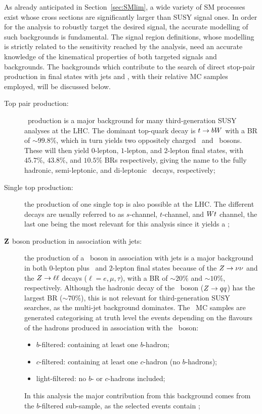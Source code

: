 		As already anticipated in Section~\ref{sec:SMlim}, a wide variety of \ac{SM} processes exist whose cross sections are significantly larger than \ac{SUSY} signal ones. In order for the analysis to robustly target the desired signal, the accurate modelling of such backgrounds is fundamental. The signal region definitions, whose modelling is strictly related to the sensitivity reached by the analysis, need an accurate knowledge of the kinematical properties of both targeted signals and backgrounds. The backgrounds which contribute to the search of direct stop-pair production in final states with jets and \met, with their relative \ac{MC} samples employed, will be discussed below.

		\begin{description}

			\item [Top pair production:] \ttbar\ production is a major background for many third-generation \ac{SUSY} analyses at the LHC. The dominant top-quark decay is $t \rightarrow b W$ with a \ac{BR} of $\sim 99.8\%$, which in turn yields two oppositely charged \bjs\ and \Wboson\ bosons. These will then yield $0$-lepton, $1$-lepton, and $2$-lepton final states, with $45.7\%$, $43.8\%$, and $10.5\%$ \acp{BR} respectively, giving the name to the fully hadronic, semi-leptonic, and di-leptonic \ttbar\ decays, respectively; 
			
			\item [Single top production:] the production of one single top is also possible at the LHC. The different decays are usually referred to as $s$-channel, $t$-channel, and $W t$ channel, the last one being the most relevant for this analysis since it yields a \Wboson; 

			\item [$\mathbf{Z}$ boson production in association with jets:] the production of a \Zboson\ boson in association with jets is a major background in both $0$-lepton plus \met\ and $2$-lepton final states because of the $Z \rightarrow \nu \nu$ and the $Z \rightarrow \ell \ell$ decays ($\ell = e,\mu,\tau$), with a \ac{BR} of $\sim 20\%$ and $\sim 10\%$, respectively. Although the hadronic decay of the \Zboson\ boson ($Z \rightarrow qq$) has the largest \ac{BR} ($\sim 70\%$), this is not relevant for third-generation \ac{SUSY} searches, as the multi-jet background dominates. The \Zjets\ \ac{MC} samples are generated categorising at truth level the events depending on the flavours of the hadrons produced in association with the \Zboson\ boson:
			\begin{itemize}
				\item $b$-filtered: containing at least one $b$-hadron;
				\item $c$-filtered: containing at least one $c$-hadron (no $b$-hadrons);
				\item light-filtered: no $b$- or $c$-hadrons included;
			\end{itemize} 
			In this analysis the major contribution from this background comes from the $b$-filtered sub-sample, as the selected events contain \bjs;


\end{description}
